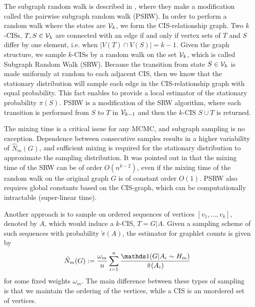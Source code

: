 The subgraph random walk is described in \cite{Wang2014psrw}, where they make a modification called the pairwise subgraph random walk (PSRW).
In order to perform a random walk where the states are $\mathcal{V}_k$, we form the CIS-relationship graph.
Two $k$-CISs, $T,S \in \mathcal{V}_k$ are connected with an edge if and only if vertex sets of $T$ and $S$ differ by one element, i.e. when $|V(T) \cap V(S)| = k-1$.
Given the graph structure, we sample $k$-CISs by a random walk on the set $\mathcal{V}_k$, which is called Subgraph Random Walk (SRW).
Because the transition from state $S \in \mathcal{V}_k$ is made uniformly at random to each adjacent CIS, then we know that the stationary distribution will sample each edge in the CIS-relationship graph with equal probability.
This fact enables \cite{Wang2014psrw} to provide a local estimator of the stationary probability $\pi(S)$.
PSRW is a modification of the SRW algorithm, where each transition is performed from $S$ to $T$ in $\mathcal{V}_{k-1}$ and then the $k$-CIS $S \cup T$ is returned.

The mixing time is a critical issue for any MCMC, and subgraph sampling is no exception.
Dependence between consecutive samples results in a higher variability of $\hat N_m(G)$, and sufficient mixing is required for the stationary distribution to approximate the sampling distribution.
It was pointed out in \cite{Bressan2017colourcoding} that the mixing time of the SRW can be of order $O(n^{k-2})$, even if the mixing time of the random walk on the original graph $G$ is of constant order $O(1)$.
PSRW also requires global constants based on the CIS-graph, which can be computationally intractable (super-linear time).

Another approach is to sample on ordered sequences of vertices $[v_1, \ldots, v_k]$, denoted by $A$, which would induce a $k$-CIS, $T = G|A$.
Given a sampling scheme of such sequences with probability $\tilde\pi(A)$, the estimator for graphlet counts is given by
\begin{equation}
  \label{eq:sequences}
  \hat N_m(G) := \frac{\omega_m}{n} \sum_{i=1}^n \frac{\ind(G|A_i\sim H_m)}{\tilde\pi(A_i)}
\end{equation}
for some fixed weights $\omega_m$.  
The main difference between these types of sampling is that we maintain the ordering of the vertices, while a CIS is an unordered set of vertices.

